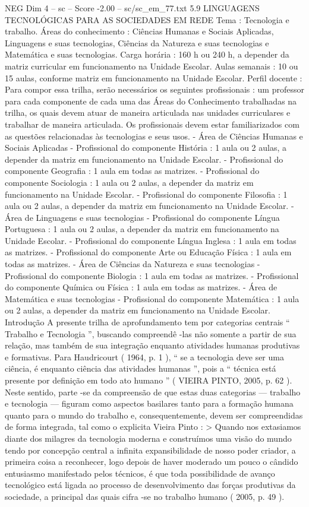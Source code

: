 \begin{textsample}{NEG Dim 4 – sc – Score -2.00 – sc/sc\_em\_77.txt}  \label{ex:f4_neg_256}
5.9 LINGUAGENS TECNOLÓGICAS PARA AS SOCIEDADES EM REDE Tema : Tecnologia e trabalho.
Áreas do conhecimento : Ciências Humanas e Sociais Aplicadas, Linguagens e suas tecnologias, Ciências da Natureza e suas tecnologias e Matemática e suas tecnologias.
Carga horária : 160 h ou 240 h, a depender da matriz curricular em funcionamento na Unidade Escolar.
Aulas semanais : 10 ou 15 aulas, conforme matriz em funcionamento na Unidade Escolar.
Perfil docente : Para compor essa trilha, serão necessários os seguintes profissionais : um professor para cada componente de cada uma das Áreas do Conhecimento trabalhadas na trilha, os quais devem atuar de maneira articulada nas unidades curriculares e trabalhar de maneira articulada.
Os profissionais devem estar familiarizados com as questões relacionadas às tecnologias e seus usos. - Área de Ciências Humanas e Sociais Aplicadas - Profissional do componente História : 1 aula ou 2 aulas, a depender da matriz em funcionamento na Unidade Escolar. - Profissional do componente Geografia : 1 aula em todas as matrizes. - Profissional do componente Sociologia : 1 aula ou 2 aulas, a depender da matriz em funcionamento na Unidade Escolar. - Profissional do componente Filosofia : 1 aula ou 2 aulas, a depender da matriz em funcionamento na Unidade Escolar. - Área de Linguagens e suas tecnologias - Profissional do componente Língua Portuguesa : 1 aula ou 2 aulas, a depender da matriz em funcionamento na Unidade Escolar. - Profissional do componente Língua Inglesa : 1 aula em todas as matrizes. - Profissional do componente Arte ou Educação Física : 1 aula em todas as matrizes. - Área de Ciências da Natureza e suas tecnologias - Profissional do componente Biologia : 1 aula em todas as matrizes. - Profissional do componente Química ou Física : 1 aula em todas as matrizes. - Área de Matemática e suas tecnologias - Profissional do componente Matemática : 1 aula ou 2 aulas, a depender da matriz em funcionamento na Unidade Escolar.
Introdução A presente trilha de aprofundamento tem por categorias centrais “ Trabalho e Tecnologia ”, buscando compreendê -las não somente a partir de sua relação, mas também de sua integração enquanto atividades humanas produtivas e formativas.
Para Haudricourt ( 1964, p. 1 ), “ se a tecnologia deve ser uma ciência, é enquanto ciência das atividades humanas ”, pois a “ técnica está presente por definição em todo ato humano ” ( VIEIRA PINTO, 2005, p. 62 ).
Neste sentido, parte -se da compreensão de que estas duas categorias — trabalho e tecnologia — figuram como aspectos basilares tanto para a formação humana quanto para o mundo do trabalho e, consequentemente, devem ser compreendidas de forma integrada, tal como o explicita Vieira Pinto : > Quando nos extasiamos diante dos milagres da tecnologia moderna e construímos uma visão do mundo tendo por concepção central a infinita expansibilidade de nosso poder criador, a primeira coisa a reconhecer, logo depois de haver moderado um pouco o cândido entusiasmo manifestado pelos técnicos, é que toda possibilidade de avanço tecnológico está ligada ao processo de desenvolvimento das forças produtivas da sociedade, a principal das quais cifra -se no trabalho humano ( 2005, p. 49 ).

\end{textsample}
